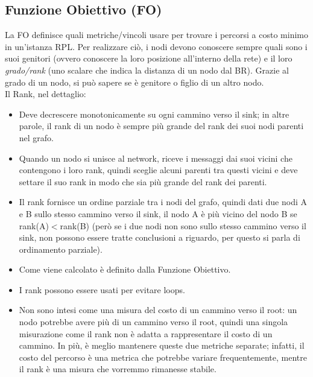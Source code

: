 \documentclass{article}
\begin{document}
\subsection{Funzione Obiettivo (FO)}
La FO definisce quali metriche/vincoli usare per trovare i percorsi a costo minimo in un'istanza RPL. Per realizzare ciò, i nodi devono conoscere sempre quali sono i suoi genitori (ovvero conoscere la loro posizione all'interno della rete) e il loro \textit{grado/rank} (uno scalare che indica la distanza di un nodo dal BR). Grazie al grado di un nodo, si può sapere se è genitore o figlio di un altro nodo. \\
Il Rank, nel dettaglio:
\begin{itemize}
    \item Deve decrescere monotonicamente su ogni cammino verso il sink; in altre parole, il rank di un nodo è sempre più grande del rank dei suoi nodi parenti nel grafo.
    \item Quando un nodo si unisce al network, riceve i messaggi dai suoi vicini che contengono i loro rank, quindi sceglie alcuni parenti tra questi vicini e deve settare il suo rank in modo che sia più grande del rank dei parenti.
    \item Il rank fornisce un ordine parziale tra i nodi del grafo, quindi dati due nodi A e B sullo stesso cammino verso il sink, il nodo A è più vicino del nodo B se rank(A)$<$rank(B) (però se i due nodi non sono sullo stesso cammino verso il sink, non possono essere tratte conclusioni a riguardo, per questo si parla di ordinamento parziale).
    \item Come viene calcolato è definito dalla Funzione Obiettivo.
    \item I rank possono essere usati per evitare loops.
    \item Non sono intesi come una misura del costo di un cammino verso il root: un nodo potrebbe avere più di un cammino verso il root, quindi una singola misurazione come il rank non è adatta a rappresentare il costo di un cammino. In più, è meglio mantenere queste due metriche separate; infatti, il costo del percorso è una metrica che potrebbe variare frequentemente, mentre il rank è una misura che vorremmo rimanesse stabile.
\end{itemize}
\end{document}
